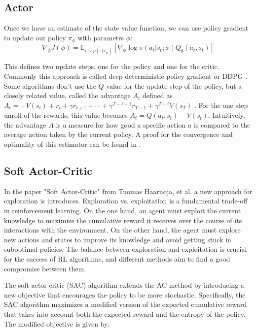\subsection{Actor}
Once we have an estimate of the state value function, we can use policy gradient to update our policy $\pi_{\phi}$ with parametrs $\phi$:
\begin{equation}
    \label{AC_general_update}
    \nabla_{\phi} J(\phi) = \mathbb{E}_{\tau \sim p(\tau | \pi_{\phi})} \left[\nabla_{\phi} \log \pi(a_t|s_t;\phi) Q_{\theta}(a_t, s_t) \right]
\end{equation}

This defines two update steps, one for the policy and one for the critic. Commonly this approach is called deep deterministic policy gradient or DDPG \cite{https://arxiv.org/pdf/1509.02971.pdf}. Some algorithms don't use the $Q$ value for the update step of the policy, but a closely 
related value, called the advantage $A_t$ defined as $A_t = -V(s_t) + r_t + \gamma r_{t+1} + \cdots + \gamma^{T-t+1} r_{T-1} + \gamma^{T-t} V(s_T)$ \cite{A2C}. For the one step 
unroll of the rewards, this value becomes $A_t = Q(a_t, s_t) - V(s_t)$. 
Intuitively, the advantage $A$ is a measure for how good a specific action $a$ is compared to the average action taken by the current policy. 
A proof for the convergence and optimality of this estimator can be found in \cite{proof_A}.

\subsection{Soft Actor-Critic}
\label{SAC}
In the paper "Soft Actor-Critic" from Tuomas Haarnoja, et al. \cite{haarnoja2018soft} a new approach for exploration is introduces. Exploration vs. exploitation 
is a fundamental trade-off in reinforcement learning. On the one hand, an agent must exploit the current knowledge to maximize the cumulative reward it receives 
over the course of its interactions with the environment. On the other hand, the agent must explore new actions and states to improve its knowledge and avoid getting stuck in suboptimal policies. 
The balance between exploration and exploitation is crucial for the success of RL algorithms, and different methods aim to find a good compromise between them.

The soft actor-critic (SAC) algorithm extends the AC method by introducing a new objective that encourages the policy to be more stochastic. Specifically, the SAC algorithm maximizes a modified 
version of the expected cumulative reward that takes into account both the expected reward and the entropy of the policy. The modified objective is given by:


